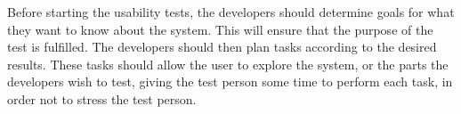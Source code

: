 % 
% 
% 

Before starting the usability tests, the developers should determine goals for what they want to know about the system\cite{isosoftwareengineering}. This will ensure that the purpose of the test is fulfilled. The developers should then plan tasks according to the desired results. These tasks should allow the user to explore the system, or the parts the developers wish to test, giving the test person some time to perform each task, in order not to stress the test person. 
% 
% 
% 
% 
% 
% 

